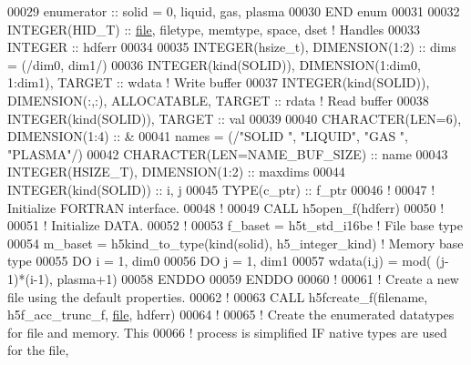 \begin{DoxyCode}
00029      enumerator :: solid = 0, liquid, gas, plasma
00030 \textcolor{keyword}{  END }enum
00031 
00032   \textcolor{keywordtype}{INTEGER(HID\_T)} :: \hyperlink{structfile}{file}, filetype, memtype, space, dset \textcolor{comment}{! Handles}
00033   \textcolor{keywordtype}{INTEGER} :: hdferr
00034 
00035   \textcolor{keywordtype}{INTEGER(hsize\_t)},   \textcolor{keywordtype}{DIMENSION(1:2)} :: dims = (/dim0, dim1/)
00036   \textcolor{keywordtype}{INTEGER(kind(SOLID))}, \textcolor{keywordtype}{DIMENSION(1:dim0, 1:dim1)}, \textcolor{keywordtype}{TARGET} :: wdata \textcolor{comment}{! Write buffer}
00037   \textcolor{keywordtype}{INTEGER(kind(SOLID))}, \textcolor{keywordtype}{DIMENSION(:,:)}, \textcolor{keywordtype}{ALLOCATABLE}, \textcolor{keywordtype}{TARGET} :: rdata \textcolor{comment}{! Read buffer}
00038   \textcolor{keywordtype}{INTEGER(kind(SOLID))}, \textcolor{keywordtype}{TARGET} :: val
00039 
00040   \textcolor{keywordtype}{CHARACTER(LEN=6)}, \textcolor{keywordtype}{DIMENSION(1:4)} :: &
00041        names = (/\textcolor{stringliteral}{"SOLID "}, \textcolor{stringliteral}{"LIQUID"}, \textcolor{stringliteral}{"GAS   "}, \textcolor{stringliteral}{"PLASMA"}/)
00042   \textcolor{keywordtype}{CHARACTER(LEN=NAME\_BUF\_SIZE)} :: name
00043   \textcolor{keywordtype}{INTEGER(HSIZE\_T)}, \textcolor{keywordtype}{DIMENSION(1:2)} :: maxdims
00044   \textcolor{keywordtype}{INTEGER(kind(SOLID))} :: i, j
00045   \textcolor{keywordtype}{TYPE}(c\_ptr) :: f\_ptr
00046   \textcolor{comment}{!}
00047   \textcolor{comment}{! Initialize FORTRAN interface.}
00048   \textcolor{comment}{!}
00049   \textcolor{keyword}{CALL }h5open\_f(hdferr)
00050   \textcolor{comment}{!}
00051   \textcolor{comment}{! Initialize DATA.}
00052   \textcolor{comment}{!}
00053   f\_baset   = h5t\_std\_i16be      \textcolor{comment}{! File base type}
00054   m\_baset   = h5kind\_to\_type(kind(solid), h5\_integer\_kind) \textcolor{comment}{! Memory base type}
00055   \textcolor{keywordflow}{DO} i = 1, dim0
00056      \textcolor{keywordflow}{DO} j = 1, dim1 
00057         wdata(i,j) = mod( (j-1)*(i-1), plasma+1)
00058 \textcolor{keywordflow}{     ENDDO}
00059 \textcolor{keywordflow}{  ENDDO}
00060   \textcolor{comment}{!}
00061   \textcolor{comment}{! Create a new file using the default properties.}
00062   \textcolor{comment}{!}
00063   \textcolor{keyword}{CALL }h5fcreate\_f(filename, h5f\_acc\_trunc\_f, \hyperlink{structfile}{file}, hdferr)
00064   \textcolor{comment}{!}
00065   \textcolor{comment}{! Create the enumerated datatypes for file and memory.  This}
00066   \textcolor{comment}{! process is simplified IF native types are used for the file,}

\end{DoxyCode}
